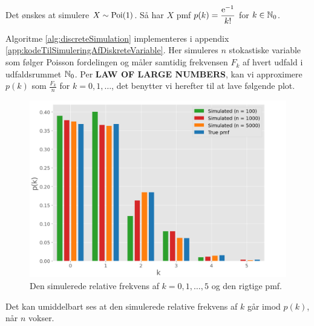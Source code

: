 \begin{exmp} \label{exmp:simuleringAfDiskreteVariable}
    Det ønskes at simulere $X \sim \textnormal{Poi}(1)$. Så har $X$ pmf $p(k) = \dfrac{\mathrm{e}^{-1}}{k!}$ for $k \in \mathbb{N}_0$.
    
    Algoritme \ref{alg:discreteSimulation} implementeres i appendix \ref{app:kodeTilSimuleringAfDiskreteVariable}. Her simuleres $n$ stokastiske variable som følger Poisson fordelingen og måler samtidig frekvensen $F_k$ af hvert udfald i udfaldsrummet $\mathbb{N}_0$.
    Per \textbf{LAW OF LARGE NUMBERS}, kan vi approximere $p(k)$ som $\frac{F_k}{n}$ for $k = 0, 1, \ldots$, det benytter vi herefter til at lave følgende plot. 
    \begin{figure}[H]
        \centering
        \includegraphics[scale=0.5]{fig/img/poisson.png} 
        \caption{Den simulerede relative frekvens af $k = 0, 1, \ldots, 5$ og den rigtige pmf.}
        \label{fig:simuleringAfPoisson}
    \end{figure}
    Det kan umiddelbart ses at den simulerede relative frekvens af $k$ går imod $p(k)$, når $n$ vokser.
\end{exmp}

